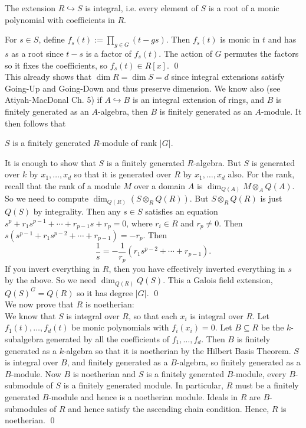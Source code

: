 
 \begin{lem}
 The extension $R \hookrightarrow S$ is integral, i.e. every element of $S$ is a root of a monic polynomial with coefficients in $R$. 
 \end{lem}

\pf For $s \in S$, define $f_s(t):= \prod_{g \in G} (t-gs)$. Then $f_s(t)$ is monic in $t$ and has $s$ as a root since $t-s$ is a factor of $f_s(t)$. The action of $G$ permutes the factors so it fixes the coefficients, so $f_s(t) \in R[x]$. \qed \\


This already shows that $\dim R= \dim S=d$ since integral extensions satisfy Going-Up and Going-Down and thus preserve dimension. We know also (see Atiyah-MacDonal Ch. 5) if $A \hookrightarrow B$ is an integral extension of rings, and $B$ is finitely generated as an $A$-algebra, then $B$ is finitely generated as an $A$-module. It then follows that

\begin{cor}
$S$ is a finitely generated $R$-module of rank $|G|$.
\end{cor}

\pf It is enough to show that $S$ is a finitely generated $R$-algebra. But $S$ is generated over $k$ by $x_1,\ldots,x_d$ so that it is generated over $R$ by $x_1, \ldots, x_d$ also. For the rank, recall that the rank of a module $M$ over a domain $A$ is $\dim_{Q(A)} M \otimes_A Q(A)$. So we need to compute $\dim_{Q(R)}(S \otimes_R Q(R))$.  But $S \otimes_R Q(R)$ is just $Q(S)$ by integrality. Then any $s \in S$ satisfies an equation $s^p + r_1s^{p-1}+\cdots+r_{p-1}s+r_p=0$, where $r_i \in R$ and $r_p \neq 0$. Then $s(s^{p-1}+r_1s^{p-2}+\cdots+r_{p-1})= -r_p$. Then
	\[
	\dfrac{1}{s}= -\dfrac{1}{r_p} \left( r_1 s^{p-2} + \cdots + r_{p-1} \right).
	\]
If you invert everything in $R$, then you have effectively inverted everything in $s$ by the above. So we need $\dim_{Q(R)} Q(S)$. This a Galois field extension, $Q(S)^G= Q(R)$ so it has degree $|G|$. \qed \\


We now prove that $R$ is noetherian: \\

We know that $S$ is integral over $R$, so that each $x_i$ is integral over $R$. Let $f_1(t), \ldots, f_d(t)$ be monic polynomials with $f_i(x_i)=0$. Let $B \subseteq R$ be the $k$-subalgebra generated by all the coefficients of $f_1,\ldots,f_d$. Then $B$ is finitely generated as a $k$-algebra so that it is noetherian by the Hilbert Basis Theorem. $S$ is integral over $B$, and finitely generated as a $B$-algebra, so finitely generated as a $B$-module. Now $B$ is noetherian and $S$ is a finitely generated $B$-module, every $B$-submodule of $S$ is a finitely generated module. In particular, $R$ must be a finitely generated $B$-module and hence is a noetherian module. Ideals in $R$ are $B$-submodules of $R$ and hence satisfy the ascending chain condition. Hence, $R$ is noetherian. \qed \\



